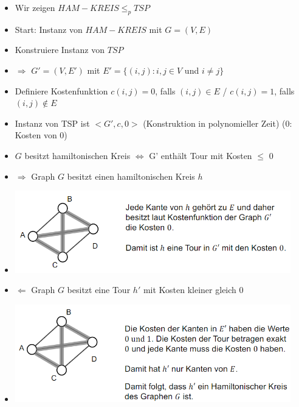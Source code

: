 \documentclass[
    ngerman,
    color=3b,
    dark_mode,
    load_common, %
    summary,
    boxarc,
]{tuda_summary}
\begin{document}
\begin{itemize}
      \item Wir zeigen $HAM-KREIS \leq_p TSP$
      \item Start: Instanz von $HAM-KREIS$ mit $G=(V,E)$
      \item Konstruiere Instanz von $TSP$
      \item[] $\Rightarrow$ $G'=(V,E')$ mit $E'=\{(i,j):i,j \in V$ und $i\neq j\}$
      \item Definiere Kostenfunktion $c(i,j) = 0$, falls $(i,j) \in E$ / $c(i,j)=1$, falls $(i,j) \notin E$
      \item Instanz von TSP ist $<G', c, 0>$ (Konstruktion in polynomieller Zeit) (0: Kosten von 0)
      \item {} $G$ besitzt hamiltonischen Kreis $\Leftrightarrow$ G' enthält Tour mit Kosten $\leq$ 0
      \item $\Rightarrow$ Graph $G$ besitzt einen hamiltonischen Kreis $h$
      \item[] \includegraphics[width=12cm]{pictures/schwer1.PNG}
      \item $\Leftarrow$ Graph $G$ besitzt eine Tour $h'$ mit Kosten kleiner gleich 0
      \item[] \includegraphics[width=12cm]{pictures/schwer2.PNG}
\end{itemize}
\end{document}
